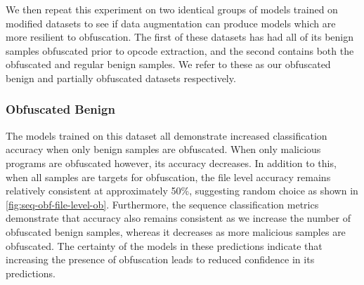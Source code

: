 \documentclass[conference,compsoc]{IEEEtran}
\begin{document}
We then repeat this experiment on two identical groups of models trained on modified datasets to see if data augmentation can produce models which are more resilient to obfuscation. The first of these datasets has had all of its benign samples obfuscated prior to opcode extraction, and the second contains both the obfuscated and regular benign samples. We refer to these as our obfuscated benign and partially obfuscated datasets respectively.  

\subsubsection{Obfuscated Benign}

The models trained on this dataset all demonstrate increased classification accuracy when only benign samples are obfuscated. When only malicious programs are obfuscated however, its accuracy decreases. In addition to this, when all samples are targets for obfuscation, the file level accuracy remains relatively consistent at approximately 50\%, suggesting random choice as shown in \ref{fig:seq-obf-file-level-ob}. Furthermore, the sequence classification metrics demonstrate that accuracy also remains consistent as we increase the number of obfuscated benign samples, whereas it decreases as more malicious samples are obfuscated. The certainty of the models in these predictions indicate that increasing the presence of obfuscation leads to reduced confidence in its predictions.

\end{document}
